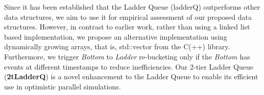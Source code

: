 Since it has been established that the Ladder Queue (ladderQ)
outperforms other data structures, we aim to use it for empirical
assessment of our proposed data structures.  However, in contrast to
earlier work, rather than using a linked list based implementation, we
propose an alternative implementation using dynamically growing
arrays, that is, std::vector from the C(++) library. Furthermore, we
trigger \textit{Bottom} to \textit{Ladder} re-bucketing only if the
\textit{Bottom} has events at different timestamps to reduce
inefficiencies. Our 2-tier Ladder Queue (\textbf{2tLadderQ}) is a
novel enhancement to the Ladder Queue to enable its efficient use in
optimistic parallel simulations.
